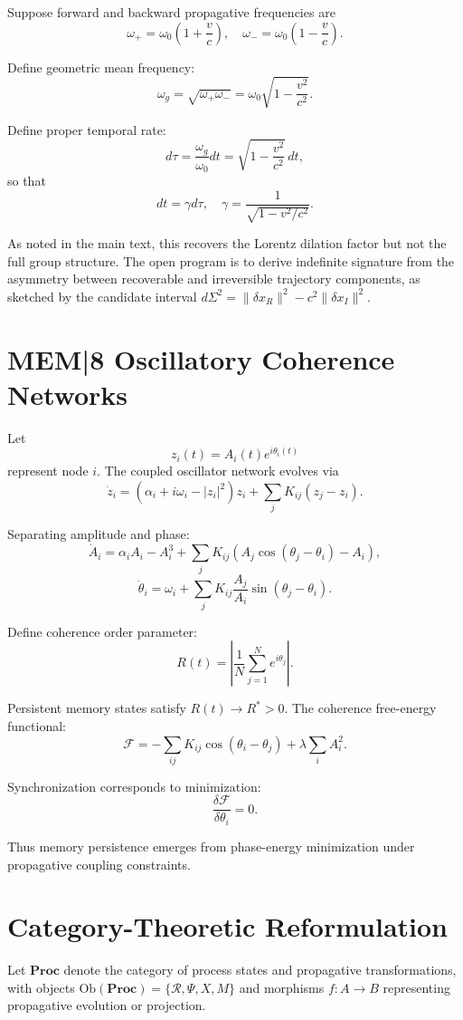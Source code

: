 \documentclass[12pt,a4paper]{article}
\begin{document}
Suppose forward and backward propagative frequencies are
\[
\omega_+
=
\omega_0
\left(
1+\frac{v}{c}
\right),
\quad
\omega_-
=
\omega_0
\left(
1-\frac{v}{c}
\right).
\]

Define geometric mean frequency:
\[
\omega_g
=
\sqrt{\omega_+\omega_-}
=
\omega_0
\sqrt{
1-\frac{v^2}{c^2}
}.
\]

Define proper temporal rate:
\[
d\tau
=
\frac{\omega_g}{\omega_0}dt
=
\sqrt{
1-\frac{v^2}{c^2}
}\,dt,
\]
so that
\[
dt
=
\gamma d\tau,
\quad
\gamma
=
\frac{1}{
\sqrt{
1-v^2/c^2
}}.
\]

As noted in the main text, this recovers the Lorentz dilation factor but not the full group structure. The open program is to derive indefinite signature from the asymmetry between recoverable and irreversible trajectory components, as sketched by the candidate interval \(d\Sigma^2 = \|\delta x_R\|^2 - c^2\|\delta x_I\|^2\).

\section{MEM|8 Oscillatory Coherence Networks}

Let
\[
z_i(t)
=
A_i(t)e^{i\theta_i(t)}
\]
represent node \(i\). The coupled oscillator network evolves via
\[
\dot{z}_i
=
(\alpha_i+i\omega_i-|z_i|^2)z_i
+
\sum_j K_{ij}(z_j-z_i).
\]

Separating amplitude and phase:
\[
\dot{A}_i
=
\alpha_iA_i
-
A_i^3
+
\sum_j K_{ij}
(A_j\cos(\theta_j-\theta_i)-A_i),
\]
\[
\dot{\theta}_i
=
\omega_i
+
\sum_j
K_{ij}
\frac{A_j}{A_i}
\sin(\theta_j-\theta_i).
\]

Define coherence order parameter:
\[
R(t)
=
\left|
\frac{1}{N}
\sum_{j=1}^N
e^{i\theta_j}
\right|.
\]

Persistent memory states satisfy \(R(t)\to R^\ast>0\). The coherence free-energy functional:
\[
\mathcal{F}
=
-
\sum_{ij}
K_{ij}
\cos(\theta_i-\theta_j)
+
\lambda
\sum_i
A_i^2.
\]

Synchronization corresponds to minimization:
\[
\frac{\delta\mathcal{F}}{\delta\theta_i}=0.
\]

Thus memory persistence emerges from phase-energy minimization under propagative coupling constraints.

\section{Category-Theoretic Reformulation}

Let \(\mathbf{Proc}\) denote the category of process states and propagative transformations, with objects \(\mathrm{Ob}(\mathbf{Proc}) = \{\mathcal{R}, \Psi, X, M\}\) and morphisms \(f : A\to B\) representing propagative evolution or projection.
\end{document}

